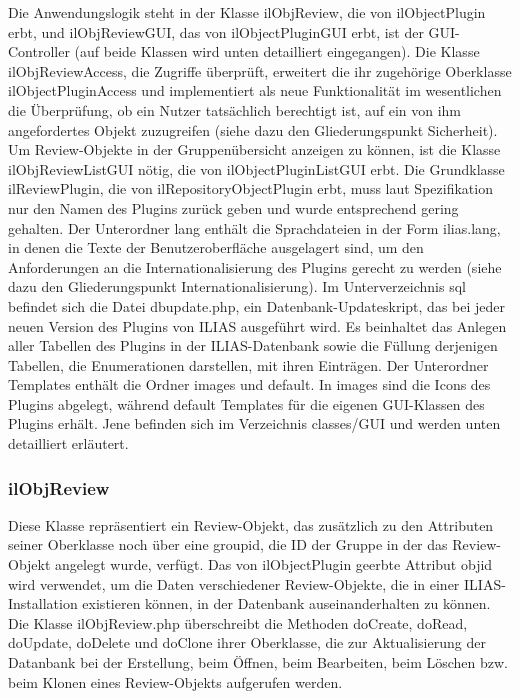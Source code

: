 \documentclass[a4paper]{scrreprt}
\begin{document}
Die Anwendungslogik steht in der Klasse ilObjReview, die von ilObjectPlugin erbt, und ilObjReviewGUI, das von ilObjectPluginGUI erbt, ist der GUI-Controller (auf beide Klassen wird unten detailliert eingegangen). 
Die Klasse ilObjReviewAccess, die Zugriffe überprüft, erweitert die ihr zugehörige Oberklasse ilObjectPluginAccess und implementiert als neue Funktionalität im wesentlichen die Überprüfung, ob ein Nutzer tatsächlich berechtigt ist, auf ein von ihm angefordertes Objekt zuzugreifen (siehe dazu den Gliederungspunkt Sicherheit). 
Um Review-Objekte in der Gruppenübersicht anzeigen zu können, ist die Klasse ilObjReviewListGUI nötig, die von ilObjectPluginListGUI erbt. 
Die Grundklasse ilReviewPlugin, die von ilRepositoryObjectPlugin erbt, muss laut Spezifikation nur den Namen des Plugins zurück geben und wurde entsprechend gering gehalten.
Der Unterordner lang enthält die Sprachdateien in der Form ilias\textunderscore[Sprachkürzel].lang, in denen die Texte der Benutzeroberfläche ausgelagert sind, um den Anforderungen an die Internationalisierung des Plugins gerecht zu werden (siehe dazu den Gliederungspunkt Internationalisierung).
Im Unterverzeichnis sql befindet sich die Datei dbupdate.php, ein Datenbank-Updateskript, das bei jeder neuen Version des Plugins von ILIAS ausgeführt wird. Es beinhaltet das Anlegen aller Tabellen des Plugins in der ILIAS-Datenbank sowie die Füllung derjenigen Tabellen, die Enumerationen darstellen, mit ihren Einträgen.
Der Unterordner Templates enthält die Ordner images und default. 
In images sind die Icons des Plugins abgelegt, während default Templates für die eigenen GUI-Klassen des Plugins erhält. 
Jene befinden sich im Verzeichnis classes/GUI und werden unten detailliert erläutert.\\

\subsubsection{ilObjReview}

Diese Klasse repräsentiert ein Review-Objekt, das zusätzlich zu den Attributen seiner Oberklasse noch über eine group\textunderscore id, die ID der Gruppe in der das Review-Objekt angelegt wurde, verfügt. 
Das von ilObjectPlugin geerbte Attribut obj\textunderscore id wird verwendet, um die Daten verschiedener Review-Objekte, die in einer ILIAS-Installation existieren können, in der Datenbank auseinanderhalten zu können.
Die Klasse ilObjReview.php überschreibt die Methoden doCreate, doRead, doUpdate, doDelete und doClone ihrer Oberklasse, die zur Aktualisierung der Datanbank bei der Erstellung, beim Öffnen, beim Bearbeiten, beim Löschen bzw. beim Klonen eines Review-Objekts aufgerufen werden. \\
\end{document}
